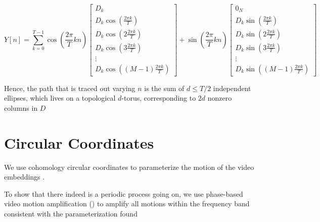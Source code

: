 \documentclass[a4paper,UKenglish]{lipics}
\begin{document}
\begin{equation}
Y[n] = \sum_{k = 0}^{T-1} \cos \left( \frac{2 \pi}{T} k n \right) \left[ \begin{array}{c} D_k \\ D_k \cos \left( \frac{2 \pi k}{T} \right) \\ D_k \cos \left( 2 \frac{2 \pi k}{T} \right) \\ D_k \cos \left( 3 \frac{2 \pi k}{T} \right) \\ \vdots \\ D_k \cos \left( (M-1) \frac{2 \pi k}{T} \right) \end{array} \right] + \sin \left( \frac{2 \pi}{T} k n \right) \left[ \begin{array}{c} 0_N \\ D_k \sin \left( \frac{2 \pi k}{T} \right) \\ D_k \sin \left( 2 \frac{2 \pi k}{T} \right) \\ D_k \sin \left( 3 \frac{2 \pi k}{T} \right) \\ \vdots \\ D_k \sin \left( (M-1) \frac{2 \pi k}{T} \right) \end{array} \right]
\end{equation}



Hence, the path that is traced out varying $n$ is the sum of $d \leq T/2$ independent ellipses, which lives on a topological $d$-torus, corresponding to $2d$ nonzero columns in $D$


\section{Circular Coordinates}


We use cohomology circular coordinates to parameterize the motion of the video embeddings \cite{de2011persistent}.

To show that there indeed is a periodic process going on, we use phase-based video motion amplification (\cite{wadhwa2013phase}) to amplify all motions within the frequency band consistent with the parameterization found 






\end{document}
